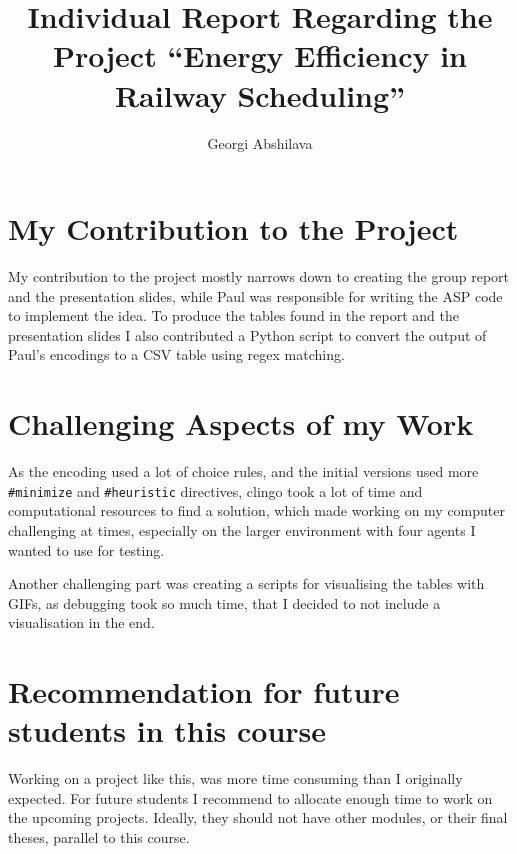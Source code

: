 \documentclass[12pt, a4paper]{llncs}
\title{Individual Report Regarding the Project \enquote{Energy Efficiency in Railway Scheduling}}
\author{Georgi Abshilava}
\institute{University of Potsdam, Germany \\
\email{abshilava@uni-potsdam.de}
}
\begin{document}
\maketitle

\section{My Contribution to the Project}
My contribution to the project mostly narrows down to creating the group report and the presentation slides, while Paul was responsible for writing the ASP code to implement the idea. To produce the tables found in the report and the presentation slides I also contributed a Python script to convert the output of Paul's encodings to a CSV table using regex matching.

\section{Challenging Aspects of my Work}
As the encoding used a lot of choice rules, and the initial versions used more \texttt{\#minimize} and \texttt{\#heuristic} directives, clingo took a lot of time and computational resources to find a solution, which made working on my computer challenging at times, especially on the larger environment with four agents I wanted to use for testing.

Another challenging part was creating a scripts for visualising the tables with GIFs, as debugging took so much time, that I decided to not include a visualisation in the end.

\section{Recommendation for future students in this course}
Working on a project like this, was more time consuming than I originally expected. For future students I recommend to allocate enough time to work on the upcoming projects. Ideally, they should not have other modules, or their final theses, parallel to this course.
\end{document}
